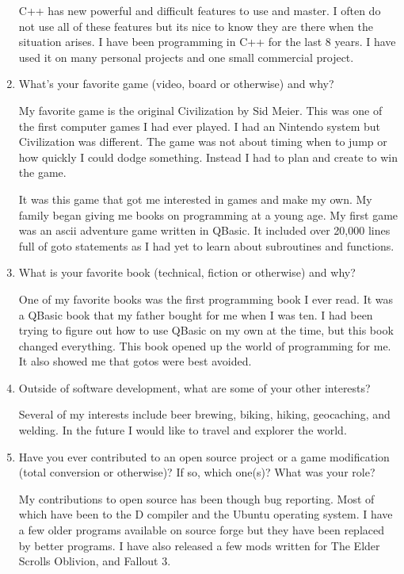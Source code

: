 \documentclass[10pts,a4paper]{article}
\begin{document}
\begin{enumerate}
C++ has new powerful and difficult features to use and master.  I often do not use all of these features but its nice to know they are there when the situation arises.  I have been programming in C++ for the last 8 years.  I have used it on many personal projects and one small commercial project.

\item What's your favorite game (video, board or otherwise) and why?

My favorite game is the original Civilization by Sid Meier.  This was one of the first computer games I had ever played.  I had an Nintendo system but Civilization was different.  The game was not about timing when to jump or how quickly I could dodge something.  Instead I had to plan and create to win the game.

It was this game that got me interested in games and make my own.  My family began giving me books on programming at a young age.  My first game was an ascii adventure game written in QBasic. It included over 20,000 lines full of goto statements as I had yet to learn about subroutines and functions.

\item  What is your favorite book (technical, fiction or otherwise) and why? 

One of my favorite books was the first programming book I ever read.  It was a QBasic book that my father bought for me when I was ten.  I had been trying to figure out how to use QBasic on my own at the time, but this book changed everything.  This book opened up the world of programming for me.  It also showed me that gotos were best avoided. 


\item Outside of software development, what are some of your other interests?

Several of my interests include beer brewing, biking, hiking, geocaching, and welding.  In the future I would like to travel and explorer the world.


\newpage

\item Have you ever contributed to an open source project or a game modification (total conversion or otherwise)?  If so, which one(s)? What was your role?

My contributions to open source has been though bug reporting.   Most of which have been to the D compiler and the Ubuntu operating system.  I have a few older programs available on source forge but they have been replaced by better programs.  I have also released a few mods written for The Elder Scrolls Oblivion, and Fallout 3.  


\end{enumerate}
\end{document}
